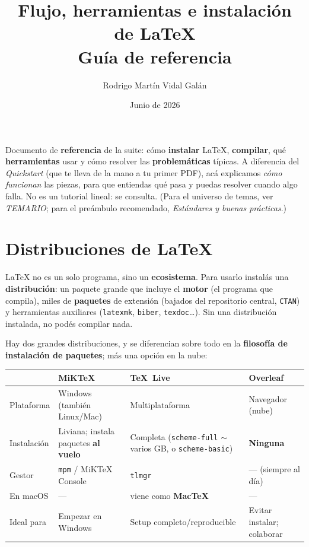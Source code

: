 \documentclass[11pt,a4paper]{article}
\title{\textbf{Flujo, herramientas e instalación de \LaTeX}\\[2pt]
       \large Guía de referencia}
\author{Rodrigo Martín Vidal Galán}
\date{Junio de 2026}
\begin{document}
\maketitle

\noindent Documento de \textbf{referencia} de la suite: cómo \textbf{instalar}
\LaTeX, \textbf{compilar}, qué \textbf{herramientas} usar y cómo resolver las
\textbf{problemáticas} típicas. A diferencia del \emph{Quickstart} (que te lleva
de la mano a tu primer PDF), acá explicamos \emph{cómo funcionan} las piezas, para
que entiendas qué pasa y puedas resolver cuando algo falla. No es un tutorial
lineal: se consulta. (Para el universo de temas, ver \emph{TEMARIO}; para el
preámbulo recomendado, \emph{Estándares y buenas prácticas}.)

\newpage
\tableofcontents
\newpage

\section{Distribuciones de LaTeX}
\LaTeX{} no es un solo programa, sino un \textbf{ecosistema}. Para usarlo
instalás una \textbf{distribución}: un paquete grande que incluye el
\textbf{motor} (el programa que compila), miles de \textbf{paquetes} de extensión
(bajados del repositorio central, \texttt{CTAN}) y herramientas auxiliares
(\texttt{latexmk}, \texttt{biber}, \texttt{texdoc}\dots). Sin una distribución
instalada, no podés compilar nada.

Hay dos grandes distribuciones, y se diferencian sobre todo en la \textbf{filosofía
de instalación de paquetes}; más una opción en la nube:

\begin{center}\small
\renewcommand{\arraystretch}{1.3}
\begin{tabularx}{\linewidth}{@{}l XXX@{}}
\toprule
 & \textbf{MiKTeX} & \textbf{TeX~Live} & \textbf{Overleaf} \\
\midrule
Plataforma & Windows (también Linux/Mac) & Multiplataforma & Navegador (nube) \\
Instalación & Liviana; instala paquetes \textbf{al vuelo} & Completa (\texttt{scheme-full} $\sim$varios GB, o \texttt{scheme-basic}) & \textbf{Ninguna} \\
Gestor & \texttt{mpm} / MiKTeX Console & \texttt{tlmgr} & — (siempre al día) \\
En macOS & — & viene como \textbf{MacTeX} & — \\
Ideal para & Empezar en Windows & Setup completo/reproducible & Evitar instalar; colaborar \\
\bottomrule
\end{tabularx}
\end{center}
\end{document}
